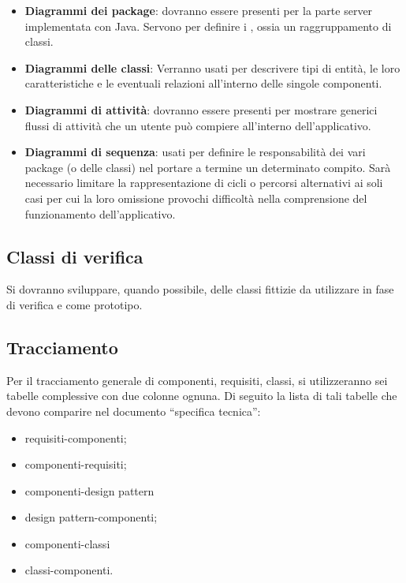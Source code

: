 {\begin{itemize}
\item \textbf{Diagrammi dei package}: dovranno essere presenti per la parte server implementata con Java. Servono per definire i , ossia un raggruppamento di classi.

\item \textbf{Diagrammi delle classi}: Verranno usati per descrivere tipi di entità, le loro caratteristiche e le eventuali relazioni all'interno delle singole componenti.

\item \textbf{Diagrammi di attività}: dovranno essere presenti per mostrare generici flussi di attività che un utente può compiere all'interno dell'applicativo.

\item \textbf{Diagrammi di sequenza}: usati per definire le responsabilità dei vari package (o delle classi) nel portare a termine un determinato compito. Sarà necessario limitare la rappresentazione di cicli o percorsi alternativi ai soli casi per cui la loro omissione provochi difficoltà nella comprensione del funzionamento dell'applicativo. 
\end{itemize}

\subsection{Classi di verifica}
Si dovranno sviluppare, quando possibile, delle classi fittizie da utilizzare in fase di verifica e come prototipo.

\subsection{Tracciamento}
\label{sec:tracciamenti_progettazione}
Per il tracciamento generale di componenti, requisiti, classi, si utilizzeranno sei tabelle complessive con due colonne ognuna. Di seguito la lista di tali tabelle che devono comparire nel documento ``specifica tecnica'':
\begin{itemize}
\item requisiti-componenti;
\item componenti-requisiti;
\item componenti-design pattern
\item design pattern-componenti;
\item componenti-classi
\item classi-componenti.
\end{itemize} 
}
